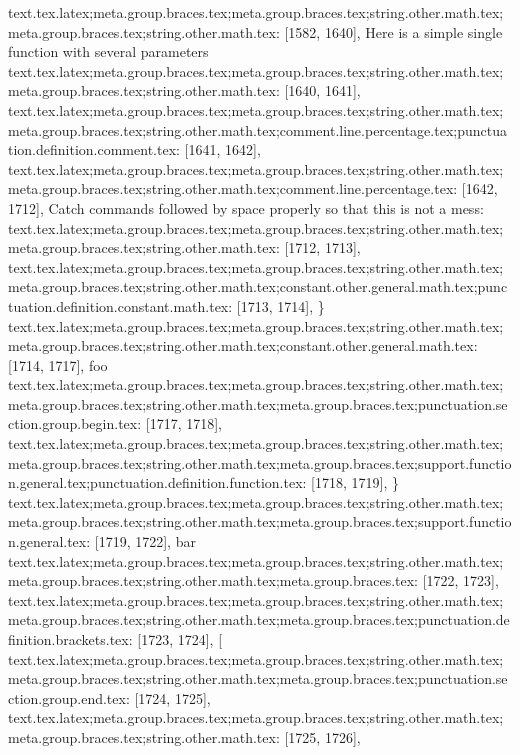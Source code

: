 {{{{{{{{{{{{{{{{{{{{{{{{{{{{{{{{{{{{{{{{text.tex.latex;meta.group.braces.tex;meta.group.braces.tex;string.other.math.tex;meta.group.braces.tex;string.other.math.tex: [1582, 1640], { Here is a simple single function with several parameters
}
text.tex.latex;meta.group.braces.tex;meta.group.braces.tex;string.other.math.tex;meta.group.braces.tex;string.other.math.tex: [1640, 1641], {
}
text.tex.latex;meta.group.braces.tex;meta.group.braces.tex;string.other.math.tex;meta.group.braces.tex;string.other.math.tex;comment.line.percentage.tex;punctuation.definition.comment.tex: [1641, 1642], {%
text.tex.latex;meta.group.braces.tex;meta.group.braces.tex;string.other.math.tex;meta.group.braces.tex;string.other.math.tex;comment.line.percentage.tex: [1642, 1712], { Catch commands followed by space properly so that this is not a mess:}
text.tex.latex;meta.group.braces.tex;meta.group.braces.tex;string.other.math.tex;meta.group.braces.tex;string.other.math.tex: [1712, 1713], {
}
text.tex.latex;meta.group.braces.tex;meta.group.braces.tex;string.other.math.tex;meta.group.braces.tex;string.other.math.tex;constant.other.general.math.tex;punctuation.definition.constant.math.tex: [1713, 1714], {\}
text.tex.latex;meta.group.braces.tex;meta.group.braces.tex;string.other.math.tex;meta.group.braces.tex;string.other.math.tex;constant.other.general.math.tex: [1714, 1717], {foo}
text.tex.latex;meta.group.braces.tex;meta.group.braces.tex;string.other.math.tex;meta.group.braces.tex;string.other.math.tex;meta.group.braces.tex;punctuation.section.group.begin.tex: [1717, 1718], {{}
text.tex.latex;meta.group.braces.tex;meta.group.braces.tex;string.other.math.tex;meta.group.braces.tex;string.other.math.tex;meta.group.braces.tex;support.function.general.tex;punctuation.definition.function.tex: [1718, 1719], {\}
text.tex.latex;meta.group.braces.tex;meta.group.braces.tex;string.other.math.tex;meta.group.braces.tex;string.other.math.tex;meta.group.braces.tex;support.function.general.tex: [1719, 1722], {bar}
text.tex.latex;meta.group.braces.tex;meta.group.braces.tex;string.other.math.tex;meta.group.braces.tex;string.other.math.tex;meta.group.braces.tex: [1722, 1723], { }
text.tex.latex;meta.group.braces.tex;meta.group.braces.tex;string.other.math.tex;meta.group.braces.tex;string.other.math.tex;meta.group.braces.tex;punctuation.definition.brackets.tex: [1723, 1724], {[}
text.tex.latex;meta.group.braces.tex;meta.group.braces.tex;string.other.math.tex;meta.group.braces.tex;string.other.math.tex;meta.group.braces.tex;punctuation.section.group.end.tex: [1724, 1725], {}}
text.tex.latex;meta.group.braces.tex;meta.group.braces.tex;string.other.math.tex;meta.group.braces.tex;string.other.math.tex: [1725, 1726], {
}}}}}}}}}}}}}}}}}}}}}}}}}}}}}}}}}}}}}}}}}}}}
